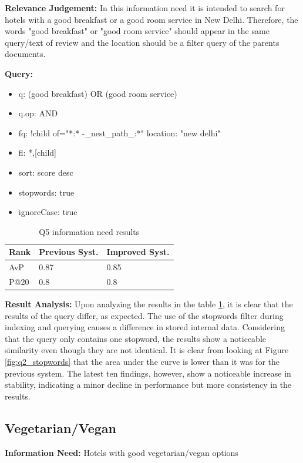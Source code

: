\documentclass[sigconf]{acmart}
\begin{document}
\textbf{Relevance Judgement:} In this information need it is intended to search for hotels with a good breakfast or a good room service in New Delhi. Therefore, the words "good breakfast" or "good room service" should appear in the same query/text of review and the location should be a filter query of the parents documents.

\textbf{Query:}

\begin{itemize}
    \item q: (good breakfast) OR (good room service)
    \item q.op: AND
    \item fq: {!child of="*:* -\_nest\_path\_:*"} location: "new delhi"
    \item fl: *,[child]
    \item sort: score desc
    \item stopwords: true
    \item ignoreCase: true
\end{itemize}

\begin{table}[H]
\caption{Q5 information need results}
\label{tab:q5}
\begin{tabular}{lll}
\toprule
Rank & Previous Syst. & Improved Syst.\\
\midrule
AvP & 0.87 & 0.85  \\
P@20 & 0.8 & 0.8 \\
\bottomrule
\end{tabular}
\end{table}

\textbf{Result Analysis:} Upon analyzing the results in the table \ref{tab:q5}, it is clear that the results of the query differ, as expected. The use of the stopwords filter during indexing and querying causes a difference in stored internal data. Considering that the query only contains one stopword, the results show a noticeable similarity even though they are not identical.
It is clear from looking at Figure \ref{fig:q2_stopwords} that the area under the curve is lower than it was for the previous system. The latest ten findings, however, show a noticeable increase in stability, indicating a minor decline in performance but more consistency in the results.


\subsection{Vegetarian/Vegan}

\textbf{Information Need:} Hotels with good vegetarian/vegan options
\end{document}
